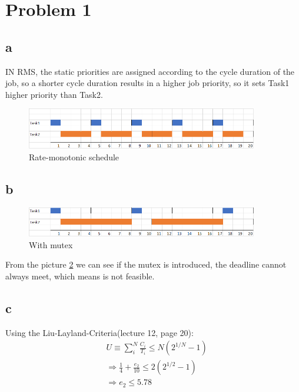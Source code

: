 \section{Problem 1}
\subsection{a}
IN RMS, the static priorities are assigned according to the cycle duration of the job, so a shorter cycle duration results in a higher job priority, so it sets Task1 higher priority than Task2.
\begin{figure}[H]
 \centering
 \includegraphics[width=0.9\textwidth]{images/rate-monotonicschedule.png}
 \caption{Rate-monotonic schedule}
 \label{a}
\end{figure}

\subsection{b}

\begin{figure}[H]
 \centering
 \includegraphics[width=0.9\textwidth]{images/mutex.png}
 \caption{With mutex}
 \label{b}
\end{figure}

From the picture \ref{b} we can see if the mutex is introduced, the deadline cannot always meet, which means is not feasible.

\subsection{c}

Using the Liu-Layland-Criteria(lecture 12, page 20):
\begin{equation}
    \begin{aligned}
        &U \equiv \sum_i^N\frac{C_i}{T_i}\leq N(2^{1/N}-1)\\
        &\Rightarrow\frac{1}{4} + \frac{e_2}{10}\leq 2(2^{1/2} -1)\\
        &\Rightarrow e_2 \leq 5.78
    \end{aligned}
\end{equation}

